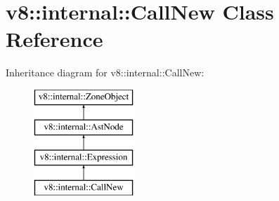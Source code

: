 \hypertarget{classv8_1_1internal_1_1_call_new}{}\section{v8\+:\+:internal\+:\+:Call\+New Class Reference}
\label{classv8_1_1internal_1_1_call_new}
Inheritance diagram for v8\+:\+:internal\+:\+:Call\+New\+:\begin{figure}[H]
\begin{center}
\leavevmode
\includegraphics[height=4.000000cm]{classv8_1_1internal_1_1_call_new}
\end{center}
\end{figure}
